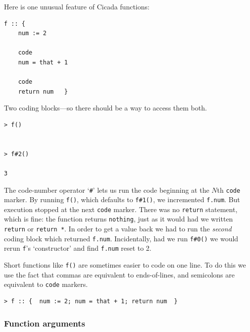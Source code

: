 \documentclass{article}
\newenvironment{code}{
       \begin{list}{}{
               \setlength{\leftmargin}{.4in}
               \setlength{\rightmargin}{0in}
               \setlength{\topsep}{.2in}
       }
       \small
       \item[] }
       { \end{list}   }
\begin{document}
Here is one unusual feature of Cicada functions:

\begin{code} \begin{verbatim}
f :: {
    num := 2
    
    code
    num = that + 1
    
    code
    return num   }
\end{verbatim} \end{code}

\noindent Two coding blocks---so there should be a way to access them both.

\begin{code} \begin{verbatim}
> f()


> f#2()

3
\end{verbatim} \end{code}

\noindent The code-number operator `\verb$#$' lets us run the code beginning at the $N$th \verb#code# marker.  By running \verb$f()$, which defaults to \verb$f#1()$, we incremented \verb#f.num#.  But execution stopped at the next \verb#code# marker.  There was no \verb#return# statement, which is fine:  the function returns \verb#nothing#, just as it would had we written \verb#return# or \verb#return *#.  In order to get a value back we had to run the \emph{second} coding block which returned \verb#f.num#.  Incidentally, had we run \verb$f#0()$ we would rerun \verb#f#'s `constructor' and find \verb#f.num# reset to 2.

Short functions like \verb#f()# are sometimes easier to code on one line.  To do this we use the fact that commas are equivalent to ends-of-lines, and semicolons are equivalent to \verb#code# markers.

\begin{code} \begin{verbatim}
> f :: {  num := 2; num = that + 1; return num  }
\end{verbatim} \end{code}








\subsubsection{Function arguments} 
\end{document}

